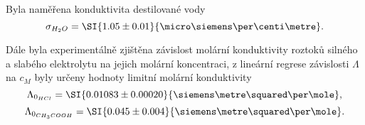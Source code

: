 \documentclass[0-protokol.tex]{subfiles}
\begin{document}
Byla naměřena konduktivita destilované vody $$ \sigma_{H_2O} = \SI{1.05 \pm 0.01}{\micro\siemens\per\centi\metre}.$$

Dále byla experimentálně zjištěna závislost molární konduktivity roztoků silného a slabého elektrolytu na jejich molární koncentraci, z lineární regrese závislosti $\Lambda$ na $c_M$ byly určeny hodnoty limitní molární konduktivity
$$ \Lambda_{0_{HCl}} = \SI{0.01083 \pm 0.00020}{\siemens\metre\squared\per\mole},$$
$$ \Lambda_{0_{CH_3COOH}} = \SI{0.045 \pm 0.004}{\siemens\metre\squared\per\mole}. $$ 
\end{document}
